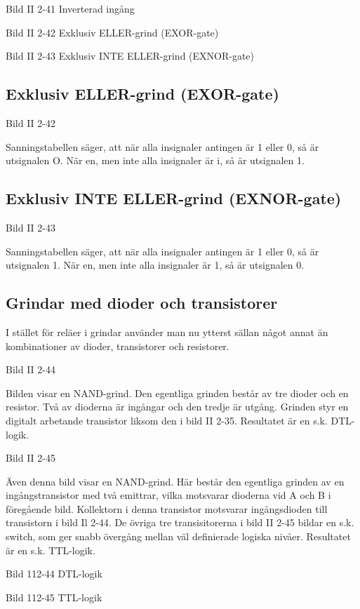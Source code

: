 Bild II 2-41 Inverterad ingång

Bild II 2-42 Exklusiv ELLER-grind (EXOR-gate)

Bild II 2-43 Exklusiv INTE ELLER-grind (EXNOR-gate)


\subsection{Exklusiv ELLER-grind (EXOR-gate)}

Bild II 2-42

Sanningstabellen säger, att när alla insignaler antingen är 1 eller 0, så är
utsignalen O. När en, men inte alla insignaler är i, så är utsignalen 1.

\subsection{Exklusiv INTE ELLER-grind (EXNOR-gate)}

Bild II 2-43

Sanningstabellen säger, att när alla insignaler antingen är 1 eller 0, så är
utsignalen 1. När en, men inte alla insignaler är 1, så är utsignalen 0.

\subsection{Grindar med dioder och transistorer}

I stället för reläer i grindar använder man nu ytterst sällan något annat än
kombinationer av dioder, transistorer och resistorer.

Bild II 2-44

Bilden visar en NAND-grind. Den egentliga grinden består av tre dioder och en
resistor. Två av dioderna är ingångar och den tredje är utgång. Grinden styr en
digitalt arbetande transistor liksom den i bild II 2-35. %
Resultatet är en s.k. DTL-logik.

Bild II 2-45

Även denna bild visar en NAND-grind. Här består den egentliga grinden av en
ingångstransistor med två emittrar, vilka motsvarar dioderna vid A och B i
föregående bild. Kollektorn i denna transistor motsvarar ingångsdioden till
transistorn i bild Il 2-44. De övriga tre transisitorerna i bild II 2-45
bildar en s.k. switch, som ger snabb övergång mellan väl definierade logiska
nivåer. Resultatet är en s.k. TTL-logik.

Bild 112-44 DTL-logik

Bild 112-45 TTL-logik
